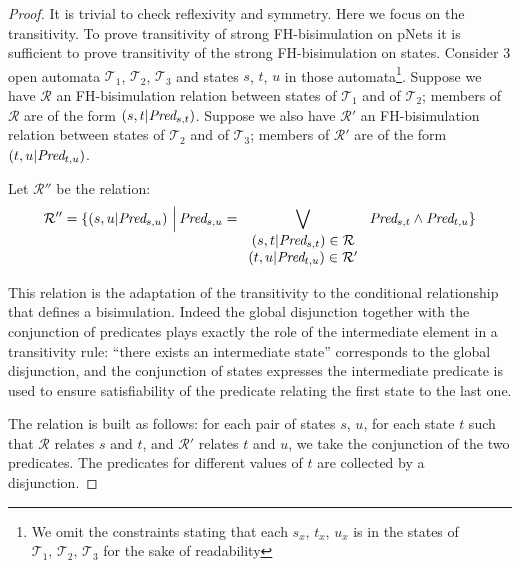 \documentclass{lmcs}
\begin{document}
              \begin{proof}
       	
       	It is trivial to check reflexivity and symmetry. Here we focus on the
       	transitivity. 
       	To prove transitivity of strong FH-bisimulation on pNets it is sufficient to 
       	prove 
       	transitivity of the strong FH-bisimulation on states. Consider 3 open automata 
       	$\mathcal{T}_1$, $\mathcal{T}_2$, $\mathcal{T}_3$ and states $s$, $t$, $u$ 
       	in those 
       	automata\footnote{We omit the constraints stating that each $s_x,\,t_x,\,u_x$ is 
       	in the 
       	states of 
       		$\mathcal{T}_1,\,\mathcal{T}_2,\,\mathcal{T}_3$ for the sake of readability}.
       	Suppose we have $\mathcal{R}$ an FH-bisimulation relation between states of 
       	$\mathcal{T}_1$ and of  $\mathcal{T}_2$; members of $\mathcal{R}$ are of the form 
       	$(s,t|\Pred_{s,t})$.
       	Suppose we also  have $\mathcal{R}'$ an FH-bisimulation relation between states 
       	of 
       	$\mathcal{T}_2$ and of  $\mathcal{T}_3$; members of $\mathcal{R}'$ are of the 
       	form 
       	$(t,u|\Pred_{t,u})$.
       	
       	Let $\mathcal{R}''$ be the relation: 
       	\[\mathcal{R}'' = 
       	\{(s,u|\Pred_{s,u})\,\,\Big|\,\Pred_{s,u}=\bigvee_{\begin{array}{c}       		
       		(s,t|\Pred_{s,t})\in\mathcal{R}\\ (t,u|\Pred_{t,u})\in\mathcal{R}' 	
       		\end{array}
       	}\,\Pred_{s,t}\land\Pred_{t,u}\}\]

This relation is the adaptation of the transitivity to the conditional relationship that 
defines a bisimulation. Indeed the global disjunction together with the conjunction of 
predicates plays exactly the role of the intermediate element in a transitivity rule: 
``there exists an intermediate state'' corresponds to the global disjunction, and the 
conjunction of states expresses the intermediate predicate is used to ensure 
satisfiability of the predicate relating the first state to the last one.
       	
       	The relation is built as follows: for each pair of states $s$, $u$, for each 
       	state 
       	$t$ such that $\mathcal{R}$ relates $s$ and $t$, and $\mathcal{R}'$ relates 
       	$t$ 
       	and $u$, we take the conjunction of the two predicates. The predicates for 
       	different 
       	values of $t$ are collected by a disjunction. 
       	

\end{proof}
\end{document}
